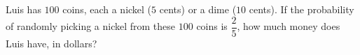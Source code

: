 Luis has $100$ coins, each a nickel ($5$ cents) or a dime ($10$ cents). If the probability of randomly picking a nickel from these $100$ coins is $\dfrac25$, how much money does Luis have, in dollars?
